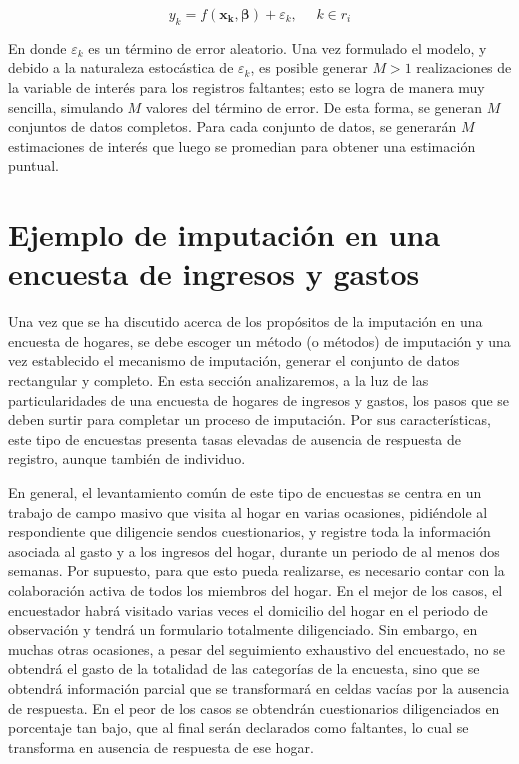 \documentclass[
  12pt,
  spanish,
]{book}
\begin{document}
\[
y_k = f(\mathbf{x_k},\boldsymbol{\beta}) + \varepsilon_k, \ \ \ \ \ \ k\in r_i
\]

En donde \(\varepsilon_k\) es un término de error aleatorio. Una vez formulado el modelo, y debido a la naturaleza estocástica de \(\varepsilon_k\), es posible generar \(M>1\) realizaciones de la variable de interés para los registros faltantes; esto se logra de manera muy sencilla, simulando \(M\) valores del término de error. De esta forma, se generan \(M\) conjuntos de datos completos. Para cada conjunto de datos, se generarán \(M\) estimaciones de interés que luego se promedian para obtener una estimación puntual.

\hypertarget{ejemplo-de-imputaciuxf3n-en-una-encuesta-de-ingresos-y-gastos}{%
\section{Ejemplo de imputación en una encuesta de ingresos y gastos}\label{ejemplo-de-imputaciuxf3n-en-una-encuesta-de-ingresos-y-gastos}}

Una vez que se ha discutido acerca de los propósitos de la imputación en una encuesta de hogares, se debe escoger un método (o métodos) de imputación y una vez establecido el mecanismo de imputación, generar el conjunto de datos rectangular y completo. En esta sección analizaremos, a la luz de las particularidades de una encuesta de hogares de ingresos y gastos, los pasos que se deben surtir para completar un proceso de imputación. Por sus características, este tipo de encuestas presenta tasas elevadas de ausencia de respuesta de registro, aunque también de individuo.

En general, el levantamiento común de este tipo de encuestas se centra en un trabajo de campo masivo que visita al hogar en varias ocasiones, pidiéndole al respondiente que diligencie sendos cuestionarios, y registre toda la información asociada al gasto y a los ingresos del hogar, durante un periodo de al menos dos semanas. Por supuesto, para que esto pueda realizarse, es necesario contar con la colaboración activa de todos los miembros del hogar. En el mejor de los casos, el encuestador habrá visitado varias veces el domicilio del hogar en el periodo de observación y tendrá un formulario totalmente diligenciado. Sin embargo, en muchas otras ocasiones, a pesar del seguimiento exhaustivo del encuestado, no se obtendrá el gasto de la totalidad de las categorías de la encuesta, sino que se obtendrá información parcial que se transformará en celdas vacías por la ausencia de respuesta. En el peor de los casos se obtendrán cuestionarios diligenciados en porcentaje tan bajo, que al final serán declarados como faltantes, lo cual se transforma en ausencia de respuesta de ese hogar.
\end{document}
